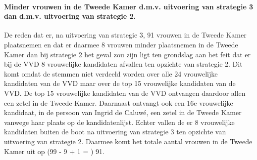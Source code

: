 \paragraph{Minder vrouwen in de Tweede Kamer d.m.v. uitvoering van strategie 3 dan d.m.v. uitvoering van strategie 2.}
De reden dat er, na uitvoering van strategie 3, 91 vrouwen in de Tweede Kamer plaatsnemen en dat er daarmee 8 vrouwen minder plaatsnemen in de Tweede Kamer dan bij strategie 2 het geval zou zijn ligt ten grondslag aan het feit dat er bij de VVD 8 vrouwelijke kandidaten afvallen ten opzichte van strategie 2. Dit komt omdat de stemmen niet verdeeld worden over alle 24 vrouwelijke kandidaten van de VVD maar over de top 15 vrouwelijke kandidaten van de VVD. De top 15 vrouwelijke kandidaten van de VVD ontvangen daardoor allen een zetel in de Tweede Kamer. Daarnaast ontvangt ook een 16e vrouwelijke kandidaat, in de persoon van Ingrid de Caluwé, een zetel in de Tweede Kamer vanwege haar plaats op de kandidatenlijst. Echter vallen de er 8 vrouwelijke kandidaten buiten de boot na uitvoering van strategie 3 ten opzichte van uitvoering van strategie 2. Daarmee komt het totale aantal vrouwen in de Tweede Kamer uit op (99 - 9 + 1 = ) 91.
